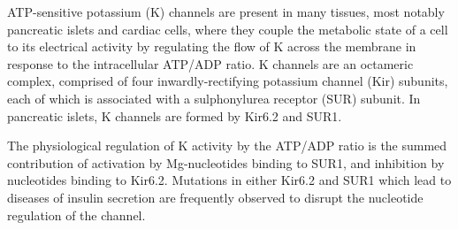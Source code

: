 ATP-sensitive potassium (K\ATP{}) channels are present in many tissues, most notably pancreatic islets and cardiac cells, where they couple the metabolic state of a cell to its electrical activity by regulating the flow of K\textsuperscript{} across the membrane in response to the intracellular ATP/ADP ratio.
K\ATP{} channels are an octameric complex, comprised of four inwardly-rectifying potassium channel (Kir) subunits, each of which is associated with a sulphonylurea receptor (SUR) subunit. 
In pancreatic islets, K\ATP{} channels are formed by Kir6.2 and SUR1.

The physiological regulation of K\ATP{} activity by the ATP/ADP ratio is the summed contribution of activation by Mg-nucleotides binding to SUR1, and inhibition by nucleotides binding to Kir6.2.
Mutations in either Kir6.2 and SUR1 which lead to diseases of insulin secretion are frequently observed to disrupt the nucleotide regulation of the channel.
